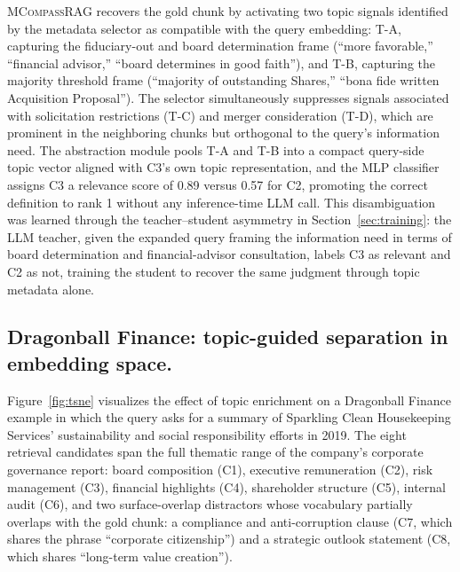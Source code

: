 \documentclass{llmxive}
\providecommand{\name}[1]{\textsc{MCompassRAG}\xspace}
\begin{document}
\name{} recovers the gold chunk by activating two topic signals identified by the metadata selector as compatible with the query embedding: T-A, capturing the fiduciary-out and board determination frame (``more favorable,'' ``financial advisor,'' ``board determines in good faith''), and T-B, capturing the majority threshold frame (``majority of outstanding Shares,'' ``bona fide written Acquisition Proposal''). The selector simultaneously suppresses signals associated with solicitation restrictions (T-C) and merger consideration (T-D), which are prominent in the neighboring chunks but orthogonal to the query's information need. The abstraction module pools T-A and T-B into a compact query-side topic vector aligned with C3's own topic representation, and the MLP classifier assigns C3 a relevance score of 0.89 versus 0.57 for C2, promoting the correct definition to rank 1 without any inference-time LLM call. This disambiguation was learned through the teacher--student asymmetry in Section~\ref{sec:training}: the LLM teacher, given the expanded query framing the information need in terms of board determination and financial-advisor consultation, labels C3 as relevant and C2 as not, training the student to recover the same judgment through topic metadata alone.

\subsection{Dragonball Finance: topic-guided separation in embedding space.}
Figure~\ref{fig:tsne} visualizes the effect of topic enrichment on a Dragonball Finance example in which the query asks for a summary of Sparkling Clean Housekeeping Services' sustainability and social responsibility efforts in 2019. The eight retrieval candidates span the full thematic range of the company's corporate governance report: board composition (C1), executive remuneration (C2), risk management (C3), financial highlights (C4), shareholder structure (C5), internal audit (C6), and two surface-overlap distractors whose vocabulary partially overlaps with the gold chunk: a compliance and anti-corruption clause (C7, which shares the phrase ``corporate citizenship'') and a strategic outlook statement (C8, which shares ``long-term value creation'').
\end{document}
